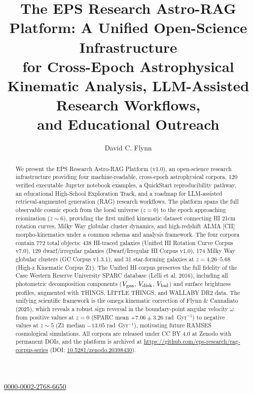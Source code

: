\documentclass[twocolumn]{aastex631}
\begin{document}
\title{The EPS Research Astro-RAG Platform: A Unified Open-Science Infrastructure\\
for Cross-Epoch Astrophysical Kinematic Analysis, LLM-Assisted Research Workflows,\\
and Educational Outreach}

\author{David C. Flynn}
\href{https://orcid.org/0000-0002-2768-6650}{0000-0002-2768-6650}

\begin{abstract}
We present the EPS Research Astro-RAG Platform (v1.0), an open-science research
infrastructure providing four machine-readable, cross-epoch astrophysical corpora,
120 verified executable Jupyter notebook examples, a QuickStart reproducibility
pathway, an educational High-School Exploration Track, and a roadmap for
LLM-assisted retrieval-augmented generation (RAG) research workflows. The platform
spans the full observable cosmic epoch from the local universe ($z = 0$) to the
epoch approaching reionization ($z \sim 6$), providing the first unified
kinematic dataset connecting HI 21cm rotation curves, Milky Way globular cluster
dynamics, and high-redshift ALMA [CII] morpho-kinematics under a common
schema and analysis framework. The four corpora contain 772 total objects:
438 HI-traced galaxies (Unified HI Rotation Curve Corpus v7.0), 129
dwarf/irregular galaxies (Dwarf/Irregular HI Corpus v1.0), 174 Milky Way
globular clusters (GC Corpus v1.3.1), and 31 star-forming galaxies at
$z = 4.26$--$5.68$ (High-z Kinematic Corpus Z1). The Unified HI corpus
preserves the full fidelity of the Case Western Reserve University SPARC
database (Lelli et al. 2016), including all photometric decomposition components
($V_{\rm gas}$, $V_{\rm disk}$, $V_{\rm bul}$) and surface brightness profiles,
augmented with THINGS, LITTLE THINGS, and WALLABY DR2 data. The unifying
scientific framework is the omega kinematic correction of Flynn \& Cannaliato
(2025), which reveals a robust sign reversal in the boundary-point angular
velocity $\omega$ from positive values at $z = 0$ (SPARC mean $+7.06 \pm 3.26$
rad~Gyr$^{-1}$) to negative values at $z \sim 5$ (Z1 median $-13.05$
rad~Gyr$^{-1}$), motivating future RAMSES cosmological simulations. All
corpora are released under CC BY 4.0 at Zenodo with permanent DOIs, and the
platform is archived at \url{https://github.com/eps-research/rag-corpus-series}
(DOI: \href{https://doi.org/10.5281/zenodo.20398430}{10.5281/zenodo.20398430}).
\end{abstract}
\end{document}
